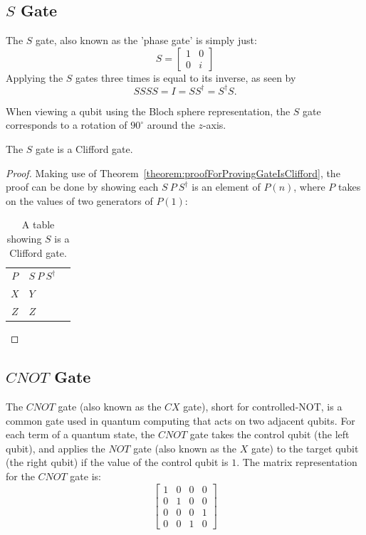 \subsection{\texorpdfstring{$S$}{S} Gate}
The $S$ gate, also known as the 'phase gate' is simply just:
$$S = \begin{bmatrix} 1 & 0 \\ 0 & i\end{bmatrix}$$
Applying the $S$ gates three times is equal to its inverse, as seen by $$SSSS = I = SS^{\dagger} = S^{\dagger}S.$$

When viewing a qubit using the Bloch sphere representation, the $S$ gate corresponds to a rotation of $90^{\circ}$ around the $z$-axis.
\begin{theorem}
The $S$ gate is a Clifford gate.
\end{theorem}
\begin{proof}
Making use of Theorem~\ref{theorem:proofForProvingGateIsClifford}, the proof can be done by showing each $S \ P \ S^{\dagger}$ is an element of $P(n)$, where $P$ takes on the values of two generators of $P(1)$:
\begin{table}[H]
\caption{A table showing $S$ is a Clifford gate. \label{table:SisAcliffordGate}}
\begin{center}
\begin{tabular}{ |cV{4}c| }
\hline
$P$ & $S \ P \ S^{\dagger}$ \\
 $X$ & $Y$ \\
\hline $Z$ & $Z$ \\
\hline
\end{tabular}
\end{center}
\end{table}
\end{proof}


\subsection{\texorpdfstring{$\mathit{CNOT}$}{} Gate}
\label{subsubsec:CX}
The $\mathit{CNOT}$ gate (also known as the $\mathit{CX}$ gate), short for controlled-NOT, is a common gate used in quantum computing that acts on two adjacent qubits. For each term of a quantum state, the $\mathit{CNOT}$ gate takes the control qubit (the left qubit), and applies the $NOT$ gate (also known as the $X$ gate) to the target qubit (the right qubit) if the value of the control qubit is $1$. The matrix representation for the $\mathit{CNOT}$ gate is:
$$\begin{bmatrix} 1 & 0 & 0 & 0 \\ 0 & 1 & 0 & 0 \\ 0 & 0 & 0 & 1 \\ 0 & 0 & 1 & 0\end{bmatrix}$$

